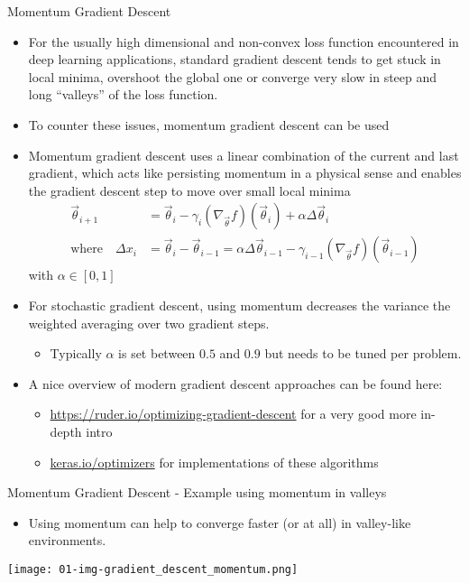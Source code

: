   \begin{frame}{Momentum Gradient Descent}
    \begin{itemize}
      \item For the usually high dimensional and non-convex loss function encountered in deep learning applications, standard gradient descent tends to get stuck in local minima, overshoot the global one or converge very slow in steep and long \enquote{valleys} of the loss function.
      \item To counter these issues, momentum gradient descent can be used
      \item Momentum gradient descent uses a linear combination of the current and last gradient, which acts like persisting momentum in a physical sense and enables the gradient descent step to move over small local minima
      \begin{align*}
        \vec{\theta}_{i+1} &= \vec{\theta}_i
          - \gamma_i (\nabla_{\vec{\theta}}f)(\vec{\theta}_i)
          + \alpha\Delta \vec{\theta}_i \\
        \text{where}\quad \Delta x_i &= \vec{\theta}_i - \vec{\theta}_{i-1}
          = \alpha \Delta \vec{\theta}_{i-1}
            - \gamma_{i-1} (\nabla_{\vec{\theta}}f)(\vec{\theta}_{i-1})
      \end{align*}
      with $\alpha\in[0, 1]$
      \item For stochastic gradient descent, using momentum decreases the variance the weighted averaging over two gradient steps.
      \begin{itemize}
        \item Typically $\alpha$ is set between $0.5$ and $0.9$ but needs to be tuned per problem.
      \end{itemize}
      \item A nice overview of modern gradient descent approaches can be found here:
      \begin{itemize}
        \item \url{https://ruder.io/optimizing-gradient-descent} for a very good more in-depth intro
        \item \url{keras.io/optimizers} for implementations of these algorithms
      \end{itemize}
    \end{itemize}
  \end{frame}

  \begin{frame}{Momentum Gradient Descent - Example using momentum in valleys}
    \begin{itemize}
      \item Using momentum can help to converge faster (or at all) in valley-like environments.
    \end{itemize}
    \texttt{[image: 01-img-gradient\_descent\_momentum.png]}
  \end{frame}

